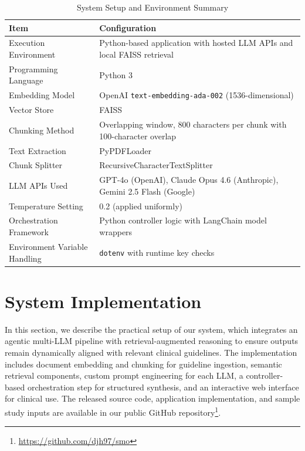 \documentclass[preprint,12pt]{elsarticle}
\begin{document}
\begin{table}[!ht]
\centering
\caption{System Setup and Environment Summary}
\label{tab:setup_summary}
\renewcommand{\arraystretch}{1.2}
\begin{tabular}{|l|p{8cm}|}
\hline
\textbf{Item} & \textbf{Configuration} \\
\hline
Execution Environment & Python-based application with hosted LLM APIs and local FAISS retrieval \\
\hline
Programming Language & Python 3 \\
\hline
Embedding Model & OpenAI \texttt{text-embedding-ada-002} (1536-dimensional) \\
\hline
Vector Store & FAISS \\
\hline
Chunking Method & Overlapping window, 800 characters per chunk with 100-character overlap \\
\hline
Text Extraction & PyPDFLoader \\
\hline
Chunk Splitter & RecursiveCharacterTextSplitter \\
\hline
LLM APIs Used & GPT-4o (OpenAI), Claude Opus 4.6 (Anthropic), Gemini 2.5 Flash (Google) \\
\hline
Temperature Setting & 0.2 (applied uniformly) \\
\hline
Orchestration Framework & Python controller logic with LangChain model wrappers \\
\hline
Environment Variable Handling & \texttt{dotenv} with runtime key checks \\
\hline
\end{tabular}
\end{table}

\section{System Implementation}
\label{sec:implementation}
In this section, we describe the practical setup of our system, which integrates an agentic multi-LLM pipeline with retrieval-augmented reasoning to ensure outputs remain dynamically aligned with relevant clinical guidelines. The implementation includes document embedding and chunking for guideline ingestion, semantic retrieval components, custom prompt engineering for each LLM, a controller-based orchestration step for structured synthesis, and an interactive web interface for clinical use. The released source code, application implementation, and sample study inputs are available in our public GitHub repository\footnote{\url{https://github.com/djh97/smo}}.
\end{document}

